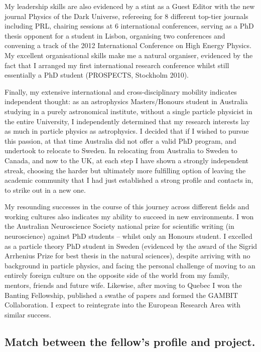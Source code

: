 \documentclass[a4paper,11pt]{article}
\begin{document}
My leadership skills are also evidenced by a stint as a Guest Editor with the new journal Physics of the Dark Universe, refereeing for 8 different top-tier journals including PRL, chairing sessions at 6 international conferences, serving as a PhD thesis opponent for a student in Lisbon, organising two conferences and convening a track of the 2012 International Conference on High Energy Physics.  My excellent organisational skills make me a natural organiser, evidenced by the fact that I arranged my first international research conference whilst still essentially a PhD student (PROSPECTS, Stockholm 2010).

Finally, my extensive international and cross-disciplinary mobility indicates independent thought: as an astrophysics Masters/Honours student in Australia studying in a purely astronomical institute, without a single particle physicist in the entire University, I independently determined that my research interests lay as much in particle physics as astrophysics.  I decided that if I wished to pursue this passion, at that time Australia did not offer a valid PhD program, and undertook to relocate to Sweden.  In relocating from Australia to Sweden to Canada, and now to the UK, at each step I have shown a strongly independent streak, choosing the harder but ultimately more fulfilling option of leaving the academic community that I had just established a strong profile and contacts in, to strike out in a new one.

My resounding successes in the course of this journey across different fields and working cultures also indicates my ability to succeed in new environments. I won the Australian Neuroscience Society national prize for scientific writing (in neuroscience) against PhD students -- whilst only an  Honours student.  I excelled as a particle theory PhD student in Sweden (evidenced by the award of the Sigrid Arrhenius Prize for best thesis in the natural sciences), despite arriving with no background in particle physics, and facing the personal challenge of moving to an entirely foreign culture on the opposite side of the world from my family, mentors, friends and future wife.  Likewise, after moving to Quebec I won the Banting Fellowship, published a swathe of papers and formed the GAMBIT Collaboration.  I expect to reintegrate into the European Research Area with similar success.

\subsection{Match between the fellow's profile and project.}
\end{document}
